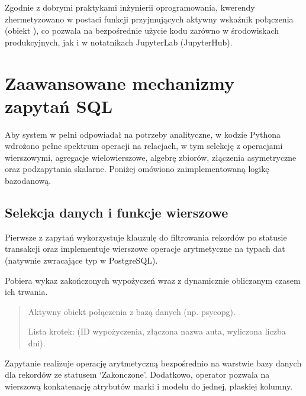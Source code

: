 \documentclass[a4paper,11pt,english,openany,oneside]{sphinxmanual}
\begin{document}
\sphinxAtStartPar
Zgodnie z dobrymi praktykami inżynierii oprogramowania, kwerendy zhermetyzowano w postaci funkcji przyjmujących aktywny wskaźnik połączenia (obiekt ), co pozwala na bezpośrednie użycie kodu zarówno w środowiskach produkcyjnych, jak i w notatnikach JupyterLab (JupyterHub).


\section{Zaawansowane mechanizmy zapytań SQL}
\label{\detokenize{rozdzial_5/index:zaawansowane-mechanizmy-zapytan-sql}}
\sphinxAtStartPar
Aby system w pełni odpowiadał na potrzeby analityczne, w kodzie Pythona wdrożono pełne spektrum operacji na relacjach, w tym selekcję z operacjami wierszowymi, agregacje wielowierszowe, algebrę zbiorów, złączenia asymetryczne oraz podzapytania skalarne. Poniżej omówiono zaimplementowaną logikę bazodanową.


\subsection{Selekcja danych i funkcje wierszowe}
\label{\detokenize{rozdzial_5/index:selekcja-danych-i-funkcje-wierszowe}}
\sphinxAtStartPar
Pierwsze z zapytań wykorzystuje klauzulę  do filtrowania rekordów po statusie transakcji oraz implementuje wierszowe operacje arytmetyczne na typach dat (natywnie zwracające typ  w PostgreSQL).


\begin{savenotes}\begin{fulllineitems}

\pysigstartsignatures
\pysiglinewithargsret
{}
{}
{}
\pysigstopsignatures
\sphinxAtStartPar
Pobiera wykaz zakończonych wypożyczeń wraz z dynamicznie obliczanym czasem ich trwania.
\begin{quote}\begin{description}
\sphinxAtStartPar
{} \textendash{} Aktywny obiekt połączenia z bazą danych (np. psycopg).

\sphinxAtStartPar
Lista krotek: (ID wypożyczenia, złączona nazwa auta, wyliczona liczba dni).

\end{description}\end{quote}

\sphinxAtStartPar
{} Zapytanie realizuje operację arytmetyczną  bezpośrednio na warstwie bazy danych dla rekordów ze statusem ‘Zakonczone’. Dodatkowo, operator \sphinxcode{\sphinxupquote{||}} pozwala na wierszową konkatenację atrybutów marki i modelu do jednej, płaskiej kolumny.

\end{fulllineitems}\end{savenotes}
\end{document}
